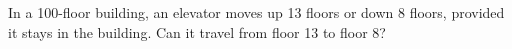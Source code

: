 In a 100-floor building, an elevator moves up 13 floors or down 8 floors, provided it stays in the building. Can it travel from floor 13 to floor 8?
